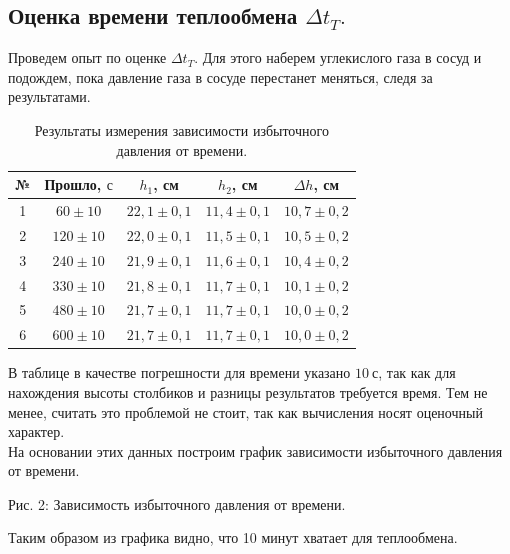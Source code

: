 \documentclass[a4paper,11pt]{article}
\begin{document}
\subsection{Оценка времени теплообмена $\Delta t_{T}.$}
Проведем опыт по оценке  $\Delta t_{T}$. Для этого наберем углекислого газа в сосуд и подождем, пока давление газа в сосуде перестанет меняться, следя за результатами.
\begin{table}[h!]
\centering
\begin{tabular}{ ||c|c|c|c|c|| }
  \hline
  № & Прошло, $с$ & $h_{1}$, см & $h_{2}$, см & $\Delta h$, см \\
  \hline
  1 &  $60 \pm 10$ & $22,1 \pm 0,1$ & $11,4 \pm 0,1$ & $10,7 \pm 0,2$ \\
  2 & $120 \pm 10$ & $22,0 \pm 0,1$ & $11,5 \pm 0,1$ & $10,5 \pm 0,2$ \\
  3 & $240 \pm 10$ & $21,9 \pm 0,1$ & $11,6 \pm 0,1$ & $10,4 \pm 0,2$ \\
  4 & $330 \pm 10$ & $21,8 \pm 0,1$ & $11,7 \pm 0,1$ & $10,1 \pm 0,2$ \\
  5 & $480 \pm 10$ & $21,7 \pm 0,1$ & $11,7 \pm 0,1$ & $10,0 \pm 0,2$ \\
  6 & $600 \pm 10$ & $21,7 \pm 0,1$ & $11,7 \pm 0,1$ & $10,0 \pm 0,2$ \\
  \hline
\end{tabular}
\caption{Результаты измерения зависимости избыточного давления от времени.}
\label{table:tab1}
\end{table}
В таблице в качестве погрешности для времени указано $10\ с$, так как для нахождения высоты столбиков и разницы результатов требуется время. Тем не менее, считать это проблемой не стоит, так как вычисления носят оценочный характер.\\
На основании этих данных построим график зависимости избыточного давления от времени.
\begin{center}
\newline
Рис. 2: Зависимость избыточного давления от времени.
\end{center}
Таким образом из графика видно, что 10 минут хватает для теплообмена.
\end{document}
